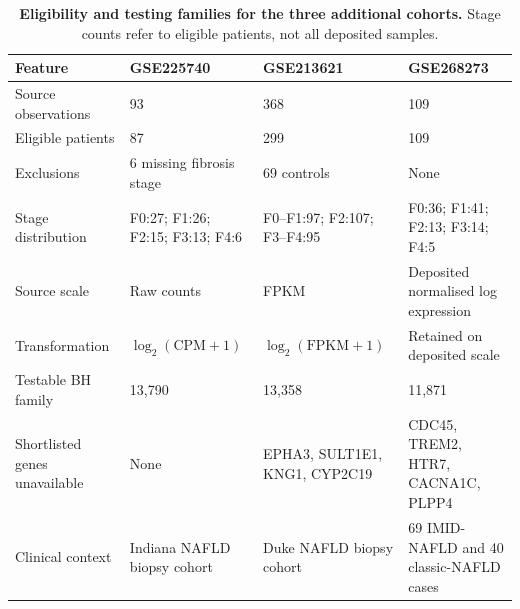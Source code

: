 \documentclass[10pt,a4paper]{article}
\newcommand{\tabsetup}{\sffamily\footnotesize\rowcolors{2}{zebra}{white}\renewcommand{\arraystretch}{1.25}\arrayrulecolor{rule}}
\begin{document}
\begin{table}[htbp]\centering\tabsetup
\caption{\textbf{Eligibility and testing families for the three additional cohorts.} Stage counts refer to eligible patients, not all deposited samples.}
\begin{tabularx}{\linewidth}{@{}lXXX@{}}
\toprule
Feature & GSE225740 & GSE213621 & GSE268273 \\
\midrule
Source observations & 93 & 368 & 109 \\
Eligible patients & 87 & 299 & 109 \\
Exclusions & 6 missing fibrosis stage & 69 controls & None \\
Stage distribution & F0:27; F1:26; F2:15; F3:13; F4:6 & F0--F1:97; F2:107; F3--F4:95 & F0:36; F1:41; F2:13; F3:14; F4:5 \\
Source scale & Raw counts & FPKM & Deposited normalised log expression \\
Transformation & $\log_2(\mathrm{CPM}+1)$ & $\log_2(\mathrm{FPKM}+1)$ & Retained on deposited scale \\
Testable BH family & 13,790 & 13,358 & 11,871 \\
Shortlisted genes unavailable & None & EPHA3, SULT1E1, KNG1, CYP2C19 & CDC45, TREM2, HTR7, CACNA1C, PLPP4 \\
Clinical context & Indiana NAFLD biopsy cohort & Duke NAFLD biopsy cohort & 69 IMID-NAFLD and 40 classic-NAFLD cases \\
\bottomrule
\end{tabularx}
\end{table}
\end{document}
